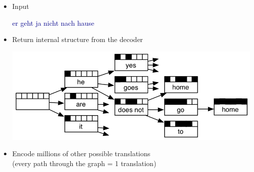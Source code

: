 \documentclass[landscape]{uedslides2C}
\newcommand{\example}[1]{\textcolor{darkblue}{\rm #1}}
\begin{document}
\begin{itemize}
\item  Input \vspace{-10mm}
\begin{center}
\example{er geht ja nicht nach hause}
\end{center}

\item Return internal structure from the decoder \vspace{-5mm}
\begin{center}
\includegraphics[scale=1.2]{search-graph.png}
\end{center}

\item Encode millions of other possible translations\\
(every path through the graph = 1 translation)

\end{itemize}


%
%  
\end{document}
